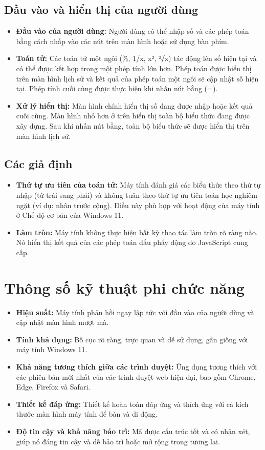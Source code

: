\documentclass{article}
\begin{document}
\subsection{Đầu vào và hiển thị của người dùng}
\begin{itemize}
    \item \textbf{Đầu vào của người dùng:} Người dùng có thể nhập số và các phép toán bằng cách nhấp vào các nút trên màn hình hoặc sử dụng bàn phím.
    \item \textbf{Toán tử:} Các toán tử một ngôi (\%, 1/x, x², ²√x) tác động lên số hiện tại và có thể được kết hợp trong một phép tính lớn hơn. Phép toán được hiển thị trên màn hình lịch sử và kết quả của phép toán một ngôi sẽ cập nhật số hiện tại. Phép tính cuối cùng được thực hiện khi nhấn nút bằng (=).
    \item \textbf{Xử lý hiển thị:} Màn hình chính hiển thị số đang được nhập hoặc kết quả cuối cùng. Màn hình nhỏ hơn ở trên hiển thị toàn bộ biểu thức đang được xây dựng. Sau khi nhấn nút bằng, toàn bộ biểu thức sẽ được hiển thị trên màn hình lịch sử.
\end{itemize}

\subsection{Các giả định}
\begin{itemize}
    \item \textbf{Thứ tự ưu tiên của toán tử:} Máy tính đánh giá các biểu thức theo thứ tự nhập (từ trái sang phải) và không tuân theo thứ tự ưu tiên toán học nghiêm ngặt (ví dụ: nhân trước cộng). Điều này phù hợp với hoạt động của máy tính ở Chế độ cơ bản của Windows 11.
    \item \textbf{Làm tròn:} Máy tính không thực hiện bất kỳ thao tác làm tròn rõ ràng nào. Nó hiển thị kết quả của các phép toán dấu phẩy động do JavaScript cung cấp.
\end{itemize}

\section{Thông số kỹ thuật phi chức năng}
\begin{itemize}
    \item \textbf{Hiệu suất:} Máy tính phản hồi ngay lập tức với đầu vào của người dùng và cập nhật màn hình mượt mà.
    \item \textbf{Tính khả dụng:} Bố cục rõ ràng, trực quan và dễ sử dụng, gần giống với máy tính Windows 11.
    \item \textbf{Khả năng tương thích giữa các trình duyệt:} Ứng dụng tương thích với các phiên bản mới nhất của các trình duyệt web hiện đại, bao gồm Chrome, Edge, Firefox và Safari.
    \item \textbf{Thiết kế đáp ứng:} Thiết kế hoàn toàn đáp ứng và thích ứng với cả kích thước màn hình máy tính để bàn và di động.
    \item \textbf{Độ tin cậy và khả năng bảo trì:} Mã được cấu trúc tốt và có nhận xét, giúp nó đáng tin cậy và dễ bảo trì hoặc mở rộng trong tương lai.
\end{itemize}
\end{document}
